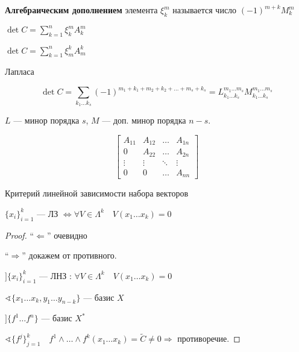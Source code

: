 \begin{definition}
    \textbf{Алгебраическим дополнением} элемента \(\xi_k^m\) называется число \((-1)^{m+k} M_k^m\)

    \(\det C = \sum\limits_{k=1}^n \xi_k^m A_k^m\)

    \(\det C = \sum\limits_{k=1}^n \xi_m^k A_m^k\)
\end{definition}

\begin{theorem}
    Лапласа

    \[\det C = \sum\limits_{k_1\ldots k_s} (-1)^{m_1+k_1+m_2+k_2+\ldots+m_s+k_s}=L^{m_1\ldots m_s}_{k_1\ldots k_s} M^{m_1\ldots m_s}_{k_1\ldots k_s}\]

    \(L\) --- минор порядка \(s\), \(M\) --- доп. минор порядка \(n-s\).
\end{theorem}

\begin{corollary}
    \[\begin{bmatrix}
            A_{11} & A_{12} & \ldots & A_{1n} \\
            0      & A_{22} & \ldots & A_{2n} \\
            \vdots & \vdots & \ddots & \vdots \\
            0      & 0      & \ldots & A_{nn}
        \end{bmatrix}\]
\end{corollary}

\begin{theorem}
    Критерий линейной зависимости набора векторов

    \(\{x_i\}_{i=1}^k\) --- ЛЗ \(\Leftrightarrow \forall V\in \Lambda^k \quad V(x_1\ldots x_k)=0\)
\end{theorem}
\begin{proof}
    ``\(\Leftarrow\)'' очевидно

    ``\(\Rightarrow\)'' докажем от противного.

    \(] \{x_i\}_{i=1}^k\) --- ЛНЗ : \(\forall V\in \Lambda^k \quad V(x_1\ldots x_k)=0\)

    \(\sphericalangle \{x_1\ldots x_k, y_1\ldots y_{n-k}\}\) --- базис \(X\)

    \(] \{f^1\ldots f^n\}\) --- базис \(X^*\)

    \(\sphericalangle \{f^j\}_{j=1}^k\quad f^1\wedge\ldots\wedge f^k(x_1\ldots x_k)=\tilde C\not=0\Rightarrow \) противоречие.
\end{proof}


